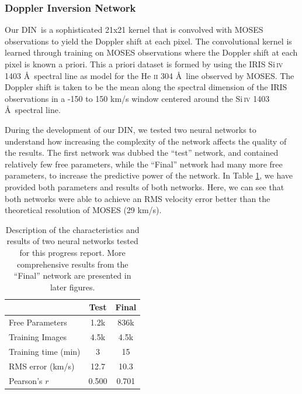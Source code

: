 \documentclass[10pt,letterpaper]{article}
\newcommand{\SiIV}{Si\,\textsc{iv} 1403 \AA}
\newcommand{\HeII}{He \textsc{ii} 304 \AA}
\newcommand{\MOSES}{\ac{MOSES}}
\newcommand{\DIN}{\ac{DIN}}
\begin{document}
			\subsubsection{Doppler Inversion Network}
				
				Our \DIN\ is a sophisticated 21x21 kernel that is convolved with MOSES observations to yield the Doppler shift at each pixel.
				The convolutional kernel is learned through training on MOSES observations where the Doppler shift at each pixel is known a priori.
				This a priori dataset is formed by using the IRIS \SiIV\ spectral line as model for the \HeII\ line observed by \MOSES.
				The Doppler shift is taken to be the mean along the spectral dimension of the IRIS observations in a -150 to 150 km/s window centered around the \SiIV\ spectral line.
				
				During the development of our \DIN, we tested two neural networks to understand how increasing the complexity of the network affects the quality of the results.
				The first network was dubbed the ``test'' network, and contained relatively few free parameters, while the ``Final'' network had many more free parameters, to increase the predictive power of the network.
				In Table \ref{nn_table}, we have provided both parameters and results of both networks.
				Here, we can see that both networks were able to achieve an RMS velocity error better than the theoretical resolution of MOSES (29 km/s).
				
				\begin{table}[h!]
					
					\centering
					\begin{tabular}{| l | c c |}
						\hline
						& Test & Final \\ \hline
						Free Parameters & 1.2k & 836k \\
						Training Images & 4.5k & 4.5k \\				
						Training time (min) & 3 & 15 \\ 
						RMS error (km/s) & 12.7 & 10.3 \\
						Pearson's $r$ & 0.500 & 0.701 \\ \hline				
					\end{tabular}					
					\caption{Description of the characteristics and results of two neural networks tested for this progress report. More comprehensive results from the ``Final'' network are presented in later figures.}
					\label{nn_table}
					
				\end{table}
				
\end{document}
